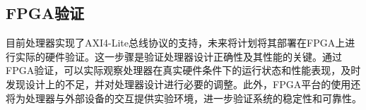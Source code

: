 \subsection{FPGA验证}

目前处理器实现了AXI4-Lite总线协议的支持，未来将计划将其部署在FPGA上进行实际的硬件验证。这一步骤是验证处理器设计正确性及其性能的关键。通过FPGA验证，可以实际观察处理器在真实硬件条件下的运行状态和性能表现，及时发现设计上的不足，并对处理器设计进行必要的调整。此外，FPGA平台的使用还将为处理器与外部设备的交互提供实验环境，进一步验证系统的稳定性和可靠性。
